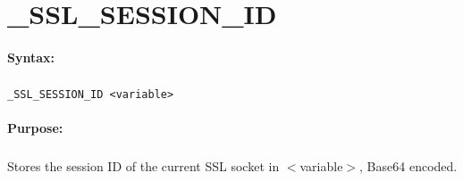 
\newpage
\section{\_SSL\_SESSION\_ID}
\label{cmd:_SSL_SESSION_ID}

\paragraph{Syntax:}
\subparagraph{}
\texttt{\_SSL\_SESSION\_ID <variable>}

\paragraph{Purpose:}
\subparagraph{}
Stores the session ID of the current SSL socket in $<$variable$>$, 
Base64 encoded.